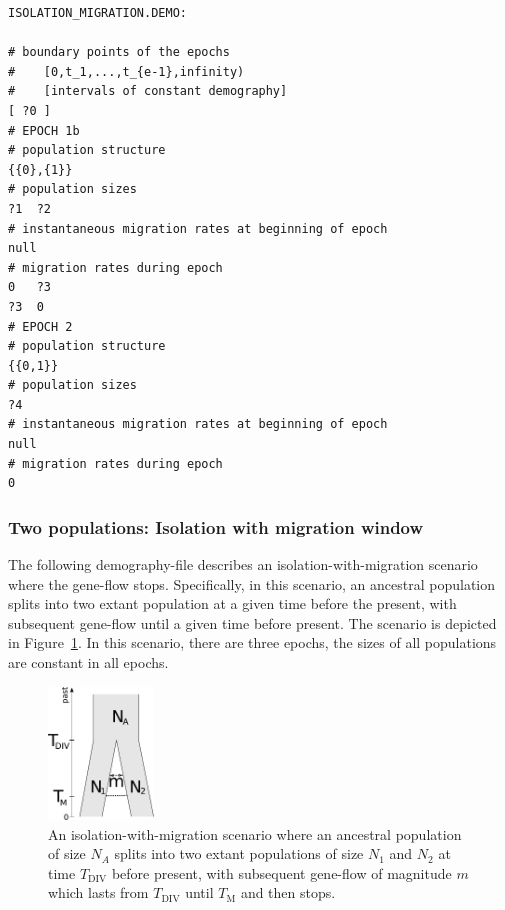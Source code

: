 \documentclass{article}
\numberwithin{equation}{section}
\begin{document}
\begin{verbatim}
ISOLATION_MIGRATION.DEMO:

# boundary points of the epochs
#    [0,t_1,...,t_{e-1},infinity)
#    [intervals of constant demography]
[ ?0 ]
# EPOCH 1b
# population structure
{{0},{1}}
# population sizes
?1	?2
# instantaneous migration rates at beginning of epoch
null
# migration rates during epoch
0	?3
?3	0
# EPOCH 2
# population structure
{{0,1}}
# population sizes
?4
# instantaneous migration rates at beginning of epoch
null
# migration rates during epoch
0
\end{verbatim}

\subsubsection{Two populations: Isolation with migration window}
\label{sec_demo_isolation_migration_window}


The following demography-file describes an isolation-with-migration scenario where the gene-flow stops. Specifically, in this scenario, an ancestral population splits into two extant population at a given time before the present, with subsequent gene-flow until a given time before present. The scenario is depicted in Figure~\ref{fig_isolation_migration_window}. In this scenario, there are three epochs, the sizes of all populations are constant in all epochs.

\begin{figure}
  \begin{center}
    \includegraphics[width=0.25\textwidth]{graphics/isolationMigrationWindow.pdf}
  \end{center} 
  \caption{An isolation-with-migration scenario where an ancestral population of size $N_A$ splits into two extant populations of size $N_1$ and $N_2$ at time $T_\text{DIV}$ before present, with subsequent gene-flow of magnitude $m$ which lasts from $T_\text{DIV}$ until $T_\text{M}$ and then stops.}
  \label{fig_isolation_migration_window}
\end{figure}
\end{document}
